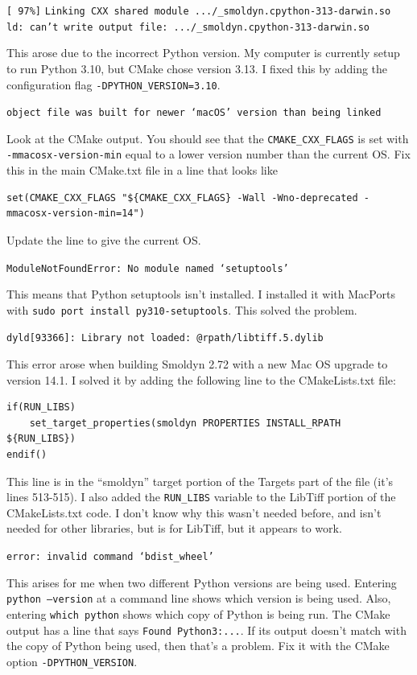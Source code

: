 \documentclass {scrbook}
\newcommand {\ttt} {\texttt}
\begin{document}
\begin{description}

\item{\ttt{[ 97\%]}}
\ttt{Linking CXX shared module .../\_smoldyn.cpython-313-darwin.so \\
ld: can't write output file: .../\_smoldyn.cpython-313-darwin.so}

This arose due to the incorrect Python version. My computer is currently setup to run Python 3.10, but CMake chose version 3.13. I fixed this by adding the configuration flag \ttt{-DPYTHON\_VERSION=3.10}.

\item{\ttt{object file was built for newer `macOS' version than being linked}}

Look at the CMake output. You should see that the \ttt{CMAKE\_CXX\_FLAGS} is set with \ttt{-mmacosx-version-min} equal to a lower version number than the current OS. Fix this in the main CMake.txt file in a line that looks like
\begin{lstlisting}
set(CMAKE_CXX_FLAGS "${CMAKE_CXX_FLAGS} -Wall -Wno-deprecated -mmacosx-version-min=14")
\end{lstlisting}
Update the line to give the current OS.

\item{\ttt{ModuleNotFoundError: No module named `setuptools'}}

This means that Python setuptools isn't installed. I installed it with MacPorts with \ttt{sudo port install py310-setuptools}. This solved the problem.

\item{\ttt{dyld[93366]: Library not loaded: @rpath/libtiff.5.dylib}}

This error arose when building Smoldyn 2.72 with a new Mac OS upgrade to version 14.1. I solved it by adding the following line to the CMakeLists.txt file:
\begin{lstlisting}
if(RUN_LIBS)
    set_target_properties(smoldyn PROPERTIES INSTALL_RPATH ${RUN_LIBS})
endif()
\end{lstlisting}
This line is in the ``smoldyn'' target portion of the Targets part of the file (it's lines 513-515). I also added the \ttt{RUN\_LIBS} variable to the LibTiff portion of the CMakeLists.txt code. I don't know why this wasn't needed before, and isn't needed for other libraries, but is for LibTiff, but it appears to work.

\item{\ttt{error: invalid command `bdist\_wheel'}}

This arises for me when two different Python versions are being used. Entering \ttt{python --version} at a command line shows which version is being used. Also, entering \ttt{which python} shows which copy of Python is being run. The CMake output has a line that says \ttt{Found Python3:...}. If its output doesn't match with the copy of Python being used, then that's a problem. Fix it with the CMake option \ttt{-DPYTHON\_VERSION}.

\end{description}
\end{document}
